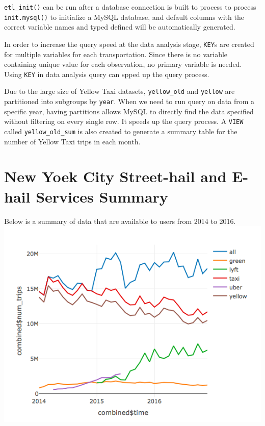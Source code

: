 \documentclass[12pt,twoside]{reedthesis}
\newenvironment{Shaded}{\begin{snugshade}}{\end{snugshade}}
\newcommand{\KeywordTok}[1]{\textcolor[rgb]{0.13,0.29,0.53}{\textbf{#1}}}
\newcommand{\DataTypeTok}[1]{\textcolor[rgb]{0.13,0.29,0.53}{#1}}
\newcommand{\StringTok}[1]{\textcolor[rgb]{0.31,0.60,0.02}{#1}}
\newcommand{\OperatorTok}[1]{\textcolor[rgb]{0.81,0.36,0.00}{\textbf{#1}}}
\newcommand{\NormalTok}[1]{#1}
\theoremstyle{definition}
\theoremstyle{definition}
\theoremstyle{definition}
\theoremstyle{remark}
\begin{document}
\texttt{etl\_init()} can be run after a database connection is built to
process to process \texttt{init.mysql()} to initialize a MySQL database,
and default columns with the correct variable names and typed defined
will be automatically generated.
\begin{Shaded}
\end{Shaded}
In order to increase the query speed at the data analysis stage,
\texttt{KEY}s are created for multiple variables for each
transportation. Since there is no variable containing unique value for
each observation, no primary variable is needed. Using \texttt{KEY} in
data analysis query can spped up the query process.

Due to the large size of Yellow Taxi datasets, \texttt{yellow\_old} and
\texttt{yellow} are partitioned into subgroups by \texttt{year}. When we
need to run query on data from a specific year, having partitions allows
MySQL to directly find the data specified without filtering on every
single row. It speeds up the query process. A \texttt{VIEW} called
\texttt{yellow\_old\_sum} is also created to generate a summary table
for the number of Yellow Taxi trips in each month.

\section{New Yoek City Street-hail and E-hail Services
Summary}\label{new-yoek-city-street-hail-and-e-hail-services-summary}

Below is a summary of data that are available to users from 2014 to
2016. \includegraphics{figure/Num_trips_summary.png}
\end{document}
